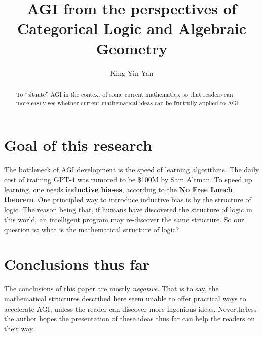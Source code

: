 \documentclass[runningheads]{llncs}
\begin{document}
%
\title{AGI from the perspectives of Categorical Logic and Algebraic Geometry}
%
%
\author{King-Yin Yan }
%
%
%
\maketitle              %
%
\begin{abstract}
To ``situate'' AGI in the context of some current mathematics, so that readers can more easily see whether current mathematical ideas can be fruitfully applied to AGI.

\end{abstract}
%
%
%
\section{Goal of this research}

The bottleneck of AGI development is the speed of learning algorithms.  The daily cost of training GPT-4 was rumored to be \$100M by Sam Altman.  To speed up learning, one needs \textbf{inductive biases}, according to the \textbf{No Free Lunch theorem}.  One principled way to introduce inductive bias is by the structure of logic.  The reason being that, if humans have discovered the structure of logic in this world, an intelligent program may re-discover the same structure.  So our question is:  what is the mathematical structure of logic?


\section{Conclusions thus far}

The conclusions of this paper are mostly \textit{negative}.  That is to say, the mathematical structures described here seem unable to offer practical ways to accelerate AGI, unless the reader can discover more ingenious ideas.  Nevertheless the author hopes the presentation of these ideas thus far can help the readers on their way.
\end{document}
